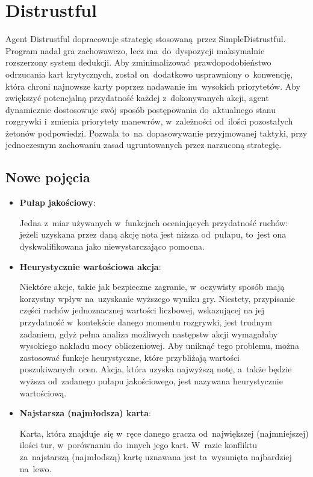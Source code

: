 \documentclass[declaration,shortabstract,inz]{iithesis}
\begin{document}
\section{Distrustful}

Agent Distrustful dopracowuje strategię stosowaną przez SimpleDistrustful. Program nadal gra zachowawczo, lecz ma~do~dyspozycji maksymalnie rozszerzony system dedukcji. Aby zminimalizować prawdopodobieństwo odrzucania kart krytycznych, został on~dodatkowo usprawniony o~konwencję, która chroni najnowsze karty poprzez nadawanie im~wysokich priorytetów. Aby zwiększyć potencjalną przydatność każdej z~dokonywanych akcji, agent dynamicznie dostosowuje swój sposób postępowania do~aktualnego stanu rozgrywki i~zmienia priorytety manewrów, w~zależności od~ilości pozostałych żetonów podpowiedzi. Pozwala to~na~dopasowywanie przyjmowanej taktyki, przy jednoczesnym zachowaniu zasad ugruntowanych przez narzuconą strategię.

\subsection*{Nowe pojęcia}

\begin{itemize}
	\item \textbf{Pułap jakościowy}:
	
	Jedna z~miar używanych w~funkcjach oceniających przydatność ruchów: jeżeli uzyskana przez daną akcję nota jest niższa od~pułapu, to~jest ona dyskwalifikowana jako niewystarczająco pomocna. 

	\item \textbf{Heurystycznie wartościowa akcja}:
	
	Niektóre akcje, takie jak bezpieczne zagranie, w~oczywisty sposób mają korzystny wpływ na~uzyskanie wyższego wyniku gry. Niestety, przypisanie części ruchów jednoznacznej wartości liczbowej, wskazującej na jej przydatność w~kontekście danego momentu rozgrywki, jest trudnym zadaniem, gdyż pełna analiza możliwych następstw akcji wymagałaby wysokiego nakładu mocy obliczeniowej. Aby uniknąć tego problemu, można zastosować funkcje heurystyczne, które przybliżają wartości poszukiwanych~ocen. Akcja, która uzyska najwyższą notę, a~także będzie wyższa od~zadanego pułapu jakościowego, jest nazywana heurystycznie wartościową.
	
	\item \textbf{Najstarsza (najmłodsza) karta}:
	
	Karta, która znajduje~się w~ręce danego gracza od~największej (najmniejszej) ilości tur, w~porównaniu do~innych jego kart. W~razie konfliktu za~najstarszą (najmłodszą) kartę uznawana jest ta~wysunięta najbardziej na~lewo.

\end{itemize}
\end{document}
